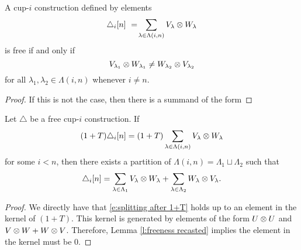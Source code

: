 %

\begin{lemma} \label{l:freeness recasted}
	A cup-$i$ construction defined by elements
	\[
	\triangle_i [n] \ = \! \sum_{\lambda \in \Lambda(i,n)} {V_\lambda} \otimes {W_\lambda}
	\]
	is free if and only if
	\[
	{V_{\lambda_1}} \otimes {W_{\lambda_1}} \neq
	{W_{\lambda_2}} \otimes {V_{\lambda_2}}
	\]
	for all $\lambda_1, \lambda_2 \in \Lambda(i,n)$ whenever $i \neq n$.
\end{lemma}

\begin{proof}
	If this is not the case, then there is a summand of the form
\end{proof}

\begin{lemma} \label{l:(1+T) triangle = 0 implies triangle = 0}
    Let $\triangle$ be a free cup-$i$ construction.
    If
    \[
    (1+T) \triangle_i [n] =
    (1+T) \sum_{\lambda \in \Lambda(i,n)} {V_\lambda} \otimes {W_\lambda}
    \]
    for some $i < n$, then there exists a partition of $\Lambda(i,n) = \Lambda_1 \sqcup \Lambda_2$ such that
    \begin{equation} \label{e:splitting after 1+T}
    \triangle_i [n] =
    \sum_{\lambda \in \Lambda_1} {V_\lambda} \otimes {W_\lambda} +
    \sum_{\lambda \in \Lambda_2} {W_\lambda} \otimes {V_\lambda}.
    \end{equation}
\end{lemma}

\begin{proof}
	We directly have that \eqref{e:splitting after 1+T} holds up to an element in the kernel of $(1+T)$.
	This kernel is generated by elements of the form $U \otimes U$ and $V \otimes W + W \otimes V$.
	Therefore, Lemma \ref{l:freeness recasted} implies the element in the kernel must be $0$.
\end{proof}